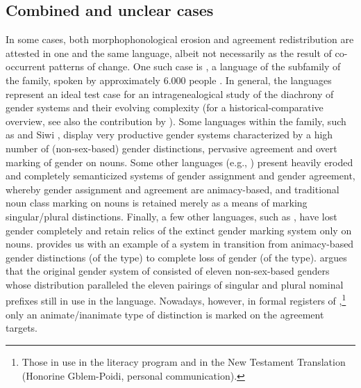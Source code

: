 \documentclass[output=collectionpaper]{langsci/langscibook}
\begin{document}
\subsection{Combined and unclear cases}
\label{subsec:combined}
In some cases, both morphophonological erosion and agreement redistribution are attested in one and the same language, albeit not necessarily as the result of co-occurrent patterns of change.
One such case is , a  language of the  subfamily of the  family, spoken by approximately 6.000 people \citep{Gblem-Poidi2007}. In general, the  languages represent an ideal test case for an intragenealogical study of the diachrony of gender systems and their evolving complexity (for a historical\hyp{}comparative overview, see also the contribution by \citealt{Gueldemannthisyear}). Some languages within the family, such as  \citep{Agbetsoamedo2014} and Siwi \citep{Dingemanse2009}, display very productive gender systems characterized by a high number of (non-sex-based) gender distinctions, pervasive agreement and overt marking of gender on nouns. Some other languages (e.g., ) present heavily eroded and completely semanticized systems of gender assignment and gender agreement, whereby gender assignment and agreement are animacy-based, and traditional noun class marking on nouns is retained merely as a means of marking singular/plural distinctions. Finally, a few other languages, such as  \citep{Soubrier2013}, have lost gender completely and retain relics of the extinct gender marking system only on nouns.  provides us with an example of a system in transition from animacy-based gender distinctions (of the  type) to complete loss of gender (of the  type).  \citet{Gblem-Poidi2007} argues that the original gender system of  consisted of eleven non-sex-based genders whose distribution paralleled the eleven pairings of singular and plural nominal prefixes still in use in the language. Nowadays, however, in formal registers of ,\footnote{Those in use in the literacy program and in the New Testament Translation (Honorine Gblem-Poidi, personal communication).} only an animate/inanimate type of distinction is marked on the agreement targets.
\end{document}
